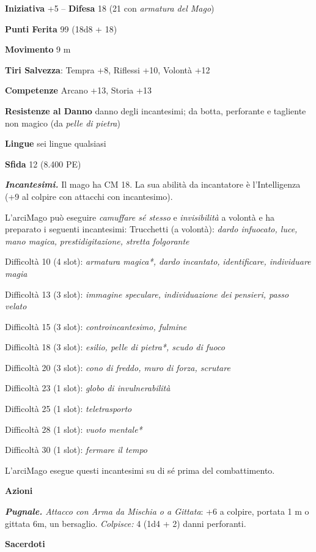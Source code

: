 \begin{multicols}{2}
\textbf{Iniziativa} +5 -- \textbf{Difesa} 18 (21 con \emph{armatura del Mago})

\textbf{Punti Ferita} 99 (18d8 + 18)

\textbf{Movimento} 9 m

\textbf{Tiri Salvezza}: Tempra +8, Riflessi +10, Volontà +12 

\textbf{Competenze} Arcano +13, Storia +13

\textbf{Resistenze al Danno} danno degli incantesimi; da botta, perforante e tagliente non magico (da \emph{pelle di pietra})

\textbf{Lingue} sei lingue qualsiasi

\textbf{Sfida} 12 (8.400 PE)

\emph{\textbf{Incantesimi.}} Il mago ha CM 18. La sua abilità da incantatore è l'Intelligenza (+9 al colpire con attacchi con incantesimo).

L'arciMago può eseguire \emph{camuffare sé stesso} e \emph{invisibilità} a volontà e ha preparato i seguenti incantesimi: Trucchetti (a volontà): \emph{dardo infuocato, luce, mano magica,}
\emph{prestidigitazione, stretta folgorante}

Difficoltà 10 (4 slot): \emph{armatura magica*, dardo incantato,}
\emph{identificare, individuare magia}

Difficoltà 13 (3 slot): \emph{immagine speculare, individuazione dei}
\emph{pensieri, passo velato}

Difficoltà 15 (3 slot): \emph{controincantesimo, fulmine}

Difficoltà 18 (3 slot): \emph{esilio, pelle di pietra*, scudo di fuoco}

Difficoltà 20 (3 slot): \emph{cono di freddo, muro di forza, scrutare}

Difficoltà 23 (1 slot): \emph{globo di invulnerabilità}

Difficoltà 25 (1 slot): \emph{teletrasporto}

Difficoltà 28 (1 slot): \emph{vuoto mentale*}

Difficoltà 30 (1 slot): \emph{fermare il tempo}

L'arciMago esegue questi incantesimi su di sé prima del combattimento.

\textbf{Azioni}

\emph{\textbf{Pugnale.} Attacco con Arma da Mischia o a Gittata}: +6 a colpire, portata 1 m o gittata 6m, un bersaglio. \emph{Colpisce:} 4 (1d4 + 2) danni perforanti.


\medskip\textbf{Sacerdoti}


\end{multicols}
